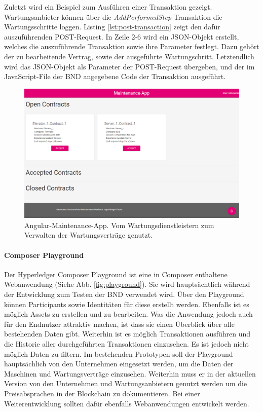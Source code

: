 Zuletzt wird ein Beispiel zum Ausführen einer Transaktion gezeigt. Wartungsanbieter können über die \textit{AddPerformedStep}-Transaktion die Wartungsschritte loggen. Listing \ref{lst:post-transaction} zeigt den dafür auszuführenden POST-Request. In Zeile 2-6 wird ein JSON-Objekt erstellt, welches die auszuführende Transaktion sowie ihre Parameter festlegt. Dazu gehört der zu bearbeitende Vertrag, sowie der ausgeführte Wartungschritt. Letztendlich wird das JSON-Objekt als Parameter der POST-Request übergeben, und der im JavaScript-File der BND angegebene Code der Transaktion ausgeführt.

\begin{figure}[!htbp]
    \centering
      \includegraphics[width=1.0\textwidth,angle=0]{images/maintenance-app}
       \caption{Angular-Maintenance-App. Vom Wartungsdienstleistern zum Verwalten der Wartungsverträge genutzt.}
      \label{fig:maintenance-app}
\end{figure}

\paragraph{Composer Playground}
Der Hyperledger Composer Playground ist eine in Composer enthaltene Webanwendung (Siehe Abb. \ref{fig:playground}). Sie wird hauptsächtlich während der Entwicklung zum Testen der BND verwendet wird. Über den Playground können Participants sowie Identitäten für diese erstellt werden. Ebenfalls ist es möglich Assets zu erstellen und zu bearbeiten. Was die Anwendung jedoch auch für den Endnutzer attraktiv machen, ist dass sie einen Überblick über alle bestehenden Daten gibt. Weiterhin ist es möglich Transaktionen ausführen und die Historie aller durchgeführten Transaktionen einzusehen. Es ist jedoch nicht möglich Daten zu filtern. Im bestehenden Prototypen soll der Playground hauptsächlich von den Unternehmen eingesetzt werden, um die Daten der Maschinen und Wartungsverträge einzusehen. Weiterhin muss er in der aktuellen Version von den Unternehmen und Wartungsanbietern genutzt werden um die Preisabsprachen in der Blockchain zu dokumentieren. Bei einer Weiterentwicklung sollten dafür ebenfalls Webanwendungen entwickelt werden.

